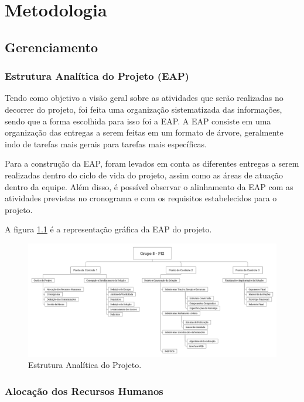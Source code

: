 \chapter{Metodologia}
  \section{Gerenciamento}
    \subsection{Estrutura Analítica do Projeto (EAP)}

Tendo como objetivo a visão geral sobre as atividades que serão
realizadas no decorrer do projeto, foi feita uma organização
sistematizada das informações, sendo que a forma escolhida para
isso foi a EAP. A EAP consiste em uma organização das entregas
a serem feitas em um formato de árvore, geralmente indo de tarefas
mais gerais para tarefas mais específicas. 

Para a construção da EAP, foram levados em conta as diferentes
entregas a serem realizadas dentro do ciclo de vida do projeto,
assim como as áreas de atuação dentro da equipe. Além disso, é
possível observar o alinhamento da EAP com as atividades previstas
no cronograma e com os requisitos estabelecidos para o projeto. 

A figura \ref{fig:eap} é a representação gráfica da EAP do projeto.

\begin{figure}[!htbp]
\begin{center}
\includegraphics[width=\textwidth]{figuras/EAP.png}
\caption{\label{fig:eap}Estrutura Analítica do Projeto.}
\end{center}
\end{figure}

    \subsection{Alocação dos Recursos Humanos}

